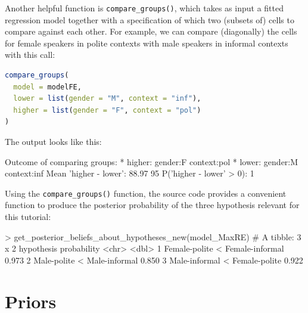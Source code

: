 \documentclass[nobib]{tufte-handout}
\begin{document}
Another helpful function is \texttt{compare\_groups()}, which takes as input a fitted
regression model together with a specification of which two (subsets of) cells to compare
against each other. For example, we can compare (diagonally) the cells for female speakers in
polite contexts with male speakers in informal contexts with this call:

\begin{minipage}[]{1.3\textwidth}
\begin{lstlisting}[language=R]
compare_groups(
  model = modelFE, 
  lower = list(gender = "M", context = "inf"),
  higher = list(gender = "F", context = "pol")
)
\end{lstlisting}
\end{minipage}

The output looks like this:

\medskip

\begin{minipage}[]{\textwidth}
\begin{rc}
Outcome of comparing groups:
 * higher:  gender:F context:pol 
 * lower:   gender:M context:inf 
Mean 'higher - lower':  88.97 
95%
P('higher - lower' > 0):  1 
\end{rc}
\end{minipage}

Using the \texttt{compare\_groups()} function, the source code provides a convenient function to
produce the posterior probability of the three hypothesis relevant for this tutorial:

\medskip

\begin{minipage}[]{\textwidth}
\begin{rc}
> get_posterior_beliefs_about_hypotheses_new(model_MaxRE)
# A tibble: 3 x 2
  hypothesis                      probability
  <chr>                                 <dbl>
1 Female-polite < Female-informal       0.973
2 Male-polite < Male-informal           0.850
3 Male-informal < Female-polite         0.922
\end{rc}
\end{minipage}

\section{Priors}
\end{document}

